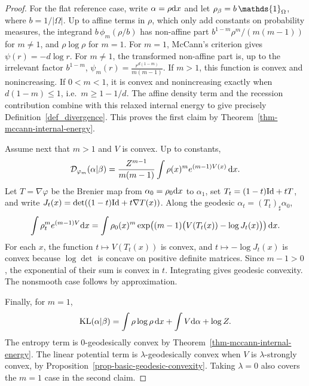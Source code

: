 \begin{proof}
	For the flat reference case, write \(\alpha=\rho\mathrm{d} x\) and let \(\density{\beta}=b\,\mathds{1}_\Omega\), where $b=1/|\Omega|$. Up to affine terms in \(\rho\), which only add constants on probability measures, the integrand \(b\,\phi_m(\rho/b)\) has non-affine part \(b^{1-m}\rho^m/(m(m-1))\) for \(m\neq1\), and \(\rho\log\rho\) for \(m=1\). For \(m=1\), McCann's criterion gives \(\psi(r)=-d\log r\). For \(m\neq1\), the transformed non-affine part is, up to the irrelevant factor \(b^{1-m}\),
	\(\psi_m(r)=\frac{r^{d(1-m)}}{m(m-1)}\).
	If \(m>1\), this function is convex and nonincreasing. If \(0<m<1\), it is convex and nonincreasing exactly when \(d(1-m)\leq1\), i.e.\ \(m\geq1-1/d\). The affine density term and the recession contribution combine with this relaxed internal energy to give precisely Definition~\ref{def_divergence}. This proves the first claim by Theorem~\ref{thm-mccann-internal-energy}.

	Assume next that \(m>1\) and \(V\) is convex. Up to constants,
	\[
		\mathcal{D}_{\varphi_m}(\alpha|\beta)
		=
		\frac{Z^{m-1}}{m(m-1)}
		\int \rho(x)^m e^{(m-1)V(x)}\,\mathrm{d} x.
	\]
	Let \(T=\nabla\varphi\) be the Brenier map from \(\alpha_0=\rho_0\mathrm{d} x\) to \(\alpha_1\), set \(T_t=(1-t)\mathrm{Id}+tT\), and write
	\(J_t(x)=\det((1-t)\mathrm{Id}+t\nabla T(x))\). Along the geodesic \(\alpha_t=(T_t)_\sharp\alpha_0\),
	\[
		\int \rho_t^m e^{(m-1)V}\mathrm{d} x
		=
		\int \rho_0(x)^m
		\exp\!\left((m-1)\big(V(T_t(x))-\log J_t(x)\big)\right)\mathrm{d} x.
	\]
	For each \(x\), the function \(t\mapsto V(T_t(x))\) is convex, and \(t\mapsto-\log J_t(x)\) is convex because \(\log\det\) is concave on positive definite matrices. Since \(m-1>0\), the exponential of their sum is convex in \(t\). Integrating gives geodesic convexity. The nonsmooth case follows by approximation.

	Finally, for \(m=1\),
	\[
		\operatorname{KL}(\alpha|\beta)
		=
		\int \rho\log\rho\,\mathrm{d} x+\int V\mathrm{d}\alpha+\log Z.
	\]
	The entropy term is \(0\)-geodesically convex by Theorem~\ref{thm-mccann-internal-energy}. The linear potential term is \(\lambda\)-geodesically convex when \(V\) is \(\lambda\)-strongly convex, by Proposition~\ref{prop-basic-geodesic-convexity}. Taking \(\lambda=0\) also covers the \(m=1\) case in the second claim.
\end{proof}
